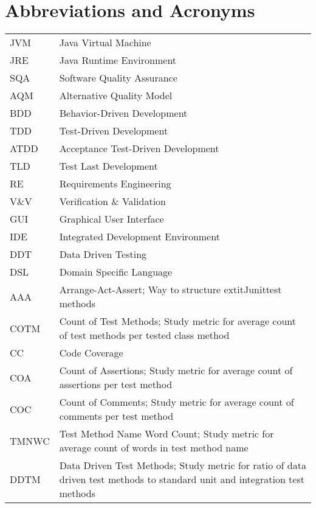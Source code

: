 \chapter*{Abbreviations and Acronyms}


\noindent
\begin{longtable}{@{}p{}p{}@{}}
JVM & Java Virtual Machine \\
JRE & Java Runtime Environment \\
SQA & Software Quality Assurance \\
AQM & Alternative Quality Model \\
BDD & Behavior-Driven Development \\
TDD & Test-Driven Development \\
ATDD & Acceptance Test-Driven Development \\
TLD & Test Last Development \\
RE & Requirements Engineering \\
V\&V & Verification \& Validation \\
GUI & Graphical User Interface \\
IDE & Integrated Development Environment \\
DDT & Data Driven Testing \\
DSL & Domain Specific Language \\
AAA & Arrange-Act-Assert; Way to structure	extit{Junit}test methods \\
COTM & Count of Test Methods; Study metric for average count of test methods per tested class method \\
CC & Code Coverage \\
COA & Count of Assertions; Study metric for average count of assertions per test method \\
COC & Count of Comments; Study metric for average count of comments per test method \\
TMNWC & Test Method Name Word Count; Study metric for average count of words in test method name \\
DDTM & Data Driven Test Methods; Study metric for ratio of data driven test methods to standard unit and integration test methods \\
\end{longtable}
